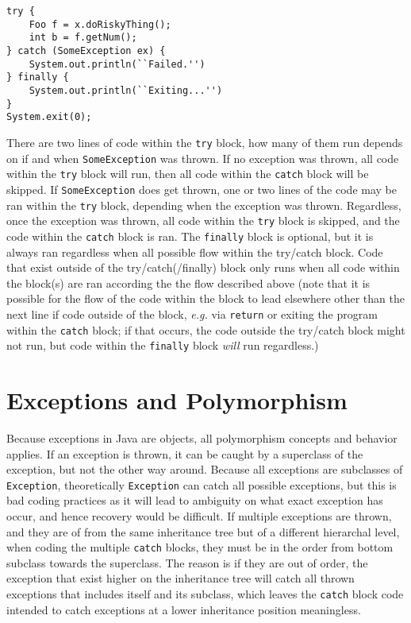 \documentclass{tufte-handout}
\begin{document}
    \begin{lstlisting}
try {
    Foo f = x.doRiskyThing();
    int b = f.getNum();
} catch (SomeException ex) {
    System.out.println(``Failed.'')
} finally {
    System.out.println(``Exiting...'')
}
System.exit(0);
    \end{lstlisting}

    There are two lines of code within the \texttt{try} block, how many of them run depends on if and when \texttt{SomeException} was thrown. If no exception was thrown, all code within the \texttt{try} block will run, then all code within the \texttt{catch} block will be skipped. If \texttt{SomeException} does get thrown, one or two lines of the code may be ran within the \texttt{try} block, depending when the exception was thrown. Regardless, once the exception was thrown, all code within the \texttt{try} block is skipped, and the code within the \texttt{catch} block is ran. The \texttt{finally} block is optional, but it is always ran regardless when all possible flow within the try/catch block. Code that exist outside of the try/catch(/finally) block only runs when all code within the block(s) are ran according the the flow described above (note that it is possible for the flow of the code within the block to lead elsewhere other than the next line if code outside of the block, \textit{e.g.} via \texttt{return} or exiting the program within the \texttt{catch} block; if that occurs, the code outside the try/catch block might not run, but code within the \texttt{finally} block \emph{will} run regardless.)

    \section*{Exceptions and Polymorphism}
    Because exceptions in Java are objects, all polymorphism concepts and behavior applies. If an exception is thrown, it can be caught by a superclass of the exception, but not the other way around. Because all exceptions are subclasses of \texttt{Exception}, theoretically \texttt{Exception} can catch all possible exceptions, but this is bad coding practices as it will lead to ambiguity on what exact exception has occur, and hence recovery would be difficult. If multiple exceptions are thrown, and they are of from the same inheritance tree but of a different hierarchal level, when coding the multiple \texttt{catch} blocks, they must be in the order from bottom subclass towards the superclass. The reason is if they are out of order, the exception that exist higher on the inheritance tree will catch all thrown exceptions that includes itself and its subclass, which leaves the \texttt{catch} block code intended to catch exceptions at a lower inheritance position meaningless. 
\end{document}
